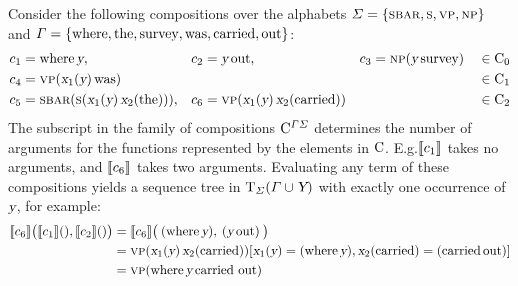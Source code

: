 \documentclass[../../document.tex]{subfiles}
\begin{document}
    \begin{example}\label{ex:dcp:comp}
        Consider the following  compositions over the alphabets \(\varSigma = \{ \textsc{sbar}, \textsc{s}, \textsc{vp}, \textsc{np} \}\) and \(\varGamma = \{\text{where}, \text{the}, \text{survey}, \text{was}, \text{carried}, \text{out}\}\):
        \begin{align*}
            c_1 &= \text{where} \, \textsl{y},
            &c_2 &= \textsl{y} \, \text{out},
            &c_3 &= \textsc{np} (\textsl{y} \, \text{survey}) && \in \mathrm{C}_0\\
            c_4 &= \textsc{vp}(\textsl{x}_1(\textsl{y}) \, \text{was}) && && && \in \mathrm{C}_1 \\
            c_5 &= \textsc{sbar} (\textsc{s} (\textsl{x}_1(\textsl{y}) \, \textsl{x}_2(\text{the}))),
            &c_6 &= \textsc{vp}(\textsl{x}_1(\textsl{y}) \, \textsl{x}_2(\text{carried})) && && \in \mathrm{C}_2
        \end{align*}
        The subscript in the family of  compositions \(\mathrm{C}^{\varGamma\varSigma}\) determines the number of arguments for the functions represented by the elements in \(\mathrm{C}\).
        E.g.\@ \(\llbracket c_1\rrbracket\) takes no arguments, and \(\llbracket c_6\rrbracket\) takes two arguments.
        Evaluating any term of these compositions yields a sequence tree in \(\operatorname{T}_\varSigma(\varGamma \cup \textsl{Y})\) with exactly one occurrence of \(\textsl{y}\), for example:
        \begin{align*}
            \llbracket c_6\rrbracket \big( \llbracket c_1\rrbracket(), \llbracket c_2\rrbracket() \big)
            &= \llbracket c_6\rrbracket \big( \: (\text{where} \, \textsl{y}), \: (\textsl{y} \, \text{out}) \: \big) \\
            &= \textsc{vp}(\textsl{x}_1(\textsl{y}) \, \textsl{x}_2(\text{carried}))[\textsl{x}_1(\textsl{y})=(\text{where} \, \textsl{y}), \textsl{x}_2(\text{carried})=(\text{carried}\, \text{out})] \\
            &= \textsc{vp}(\text{where} \, \textsl{y} \, \text{carried out})
        \end{align*}
    \end{example}
\end{document}
